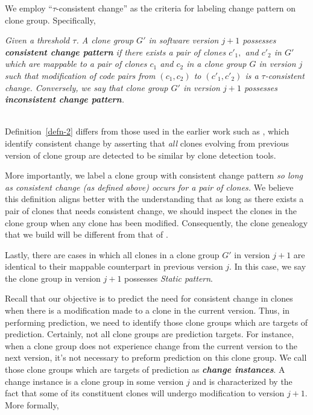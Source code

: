 We employ ``$\tau$-consistent change'' as the criteria for labeling change pattern on clone group. Specifically, \\

\begin{definition} 
  \label{}
  {\em 
  Given a threshold $\tau$. A clone group $G'$ in software version $j+1$ possesses {\em\bf consistent change pattern} if there exists a pair of clones $c'_1,$ and $c'_2$  in $G'$ which are mappable to a pair of clones $c_1$ and $c_2$ in a clone group $G$ in version $j$ such that modification of code pairs from $(c_1,c_2)$ to $(c'_1,c'_2)$ is a $\tau$-consistent change. Conversely, we say that clone group $G'$ in version $j+1$ possesses {\em\bf inconsistent change pattern}.
  } 
\end{definition}

~\\
Definition~\ref{defn-2} differs from those used in the earlier work such as \cite{Kim2005,Saha2011}, which identify consistent change by asserting that {\em all} clones evolving from previous version of clone group are detected to be similar by clone detection tools.

More importantly, we label a clone group with consistent change pattern {\em so long as consistent change (as defined above) occurs for a pair of clones.\/} 
We believe this definition aligns better with the understanding that as long as there exists a pair of clones that needs consistent change, we should inspect the clones in the clone group when any clone has been modified.
Consequently, the clone genealogy that we build will be different from that of \cite{Kim2005,Saha2011}. 

Lastly, there are cases in which all clones in a clone
group $G'$ in version $j+1$ are identical to their mappable
counterpart in previous version $j$. In this case, we say the clone
group in version $j+1$ possesses {\em Static pattern}.


Recall that our objective is to predict the need for consistent change in clones when there is a modification made to a clone in the current version. 
Thus, in performing prediction, we need to identify those clone groups which are targets of prediction.
Certainly, not all clone groups are prediction targets.
For instance, when a clone group does not experience change from the current version to the next version, it's not necessary to preform prediction on this clone group.
We call those clone groups which are targets of prediction as {\em {\bf change instances}}. 
A change instance is a clone group in some version $j$ and is characterized by the fact that some of its constituent clones will undergo modification to version $j+1$. 
More formally, \\

